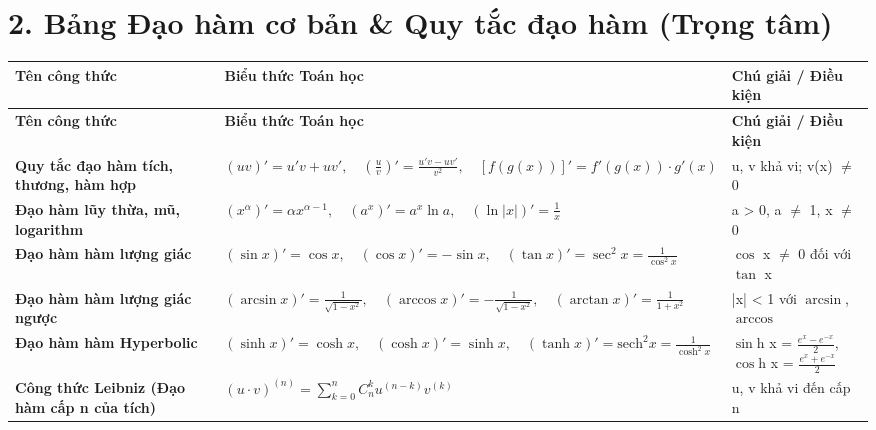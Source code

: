 \documentclass[11pt,a4paper,oneside]{book}
\begin{document}
\section*{2. Bảng Đạo hàm cơ bản \& Quy tắc đạo hàm (Trọng tâm)}
\begin{longtable}{|p{}|p{}|p{}|}
\hline
\rowcolor{blue!10} \textbf{Tên công thức} & \textbf{Biểu thức Toán học} & \textbf{Chú giải / Điều kiện} \\ \hline
\endfirsthead
\hline
\rowcolor{blue!10} \textbf{Tên công thức} & \textbf{Biểu thức Toán học} & \textbf{Chú giải / Điều kiện} \\ \hline
\endhead
\textbf{Quy tắc đạo hàm tích, thương, hàm hợp} & $\displaystyle (uv)' = u'v + uv', \quad \left(\frac{u}{v}\right)' = \frac{u'v - uv'}{v^2}, \quad [f(g(x))]' = f'(g(x))\cdot g'(x)$ & u, v khả vi; v(x) $\neq$ 0 \\ \hline
\textbf{Đạo hàm lũy thừa, mũ, logarithm} & $\displaystyle (x^\alpha)' = \alpha x^{\alpha-1}, \quad (a^x)' = a^x \ln a, \quad (\ln |x|)' = \frac{1}{x}$ & a > 0, a $\neq$ 1, x $\neq$ 0 \\ \hline
\textbf{Đạo hàm hàm lượng giác} & $\displaystyle (\sin x)' = \cos x, \quad (\cos x)' = -\sin x, \quad (\tan x)' = \sec^2 x = \frac{1}{\cos^2 x}$ & $\cos$ x $\neq$ 0 đối với $\tan$ x \\ \hline
\textbf{Đạo hàm hàm lượng giác ngược} & $\displaystyle (\arcsin x)' = \frac{1}{\sqrt{1-x^2}}, \quad (\arccos x)' = -\frac{1}{\sqrt{1-x^2}}, \quad (\arctan x)' = \frac{1}{1+x^2}$ & |x| < 1 với $\arcsin$, $\arccos$ \\ \hline
\textbf{Đạo hàm hàm Hyperbolic} & $\displaystyle (\sinh x)' = \cosh x, \quad (\cosh x)' = \sinh x, \quad (\tanh x)' = \text{sech}^2 x = \frac{1}{\cosh^2 x}$ & $\sin$h x = $\frac{e^x - e^{-x}}{2}$, $\cos$h x = $\frac{e^x + e^{-x}}{2}$ \\ \hline
\textbf{Công thức Leibniz (Đạo hàm cấp n của tích)} & $\displaystyle (u \cdot v)^{(n)} = \sum_{k=0}^{n} C_n^k u^{(n-k)} v^{(k)}$ & u, v khả vi đến cấp n \\ \hline
\end{longtable}
\end{document}
